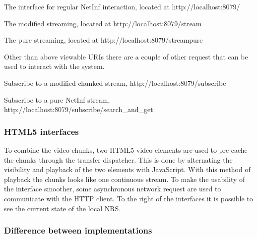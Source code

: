 The interface for regular NetInf interaction, located at 
http://localhost:8079/

The modified streaming, located at
http://localhost:8079/stream

The pure streaming, located at
http://localhost:8079/streampure

Other than above viewable URIs there are a couple of other request that can be used to interact with the system. 

Subscribe to a modified chunked stream, http://localhost:8079/subscribe

Subscribe to a pure NetInf stream, http://localhost:8079/subscribe/search\_and\_get


\subsubsection{HTML5 interfaces}
To combine the video chunks, two HTML5 video elements are used to pre-cache the chunks through the transfer dispatcher. This is done by alternating the visibility and playback of the two elements with JavaScript. With this method of playback the chunks looks like one continuous stream. 
To make the usability of the interface smoother, some asynchronous network request are used to communicate with the HTTP client.
To the right of the interfaces it is possible to see the current state of the local NRS. 

\subsubsection{Difference between implementations}
